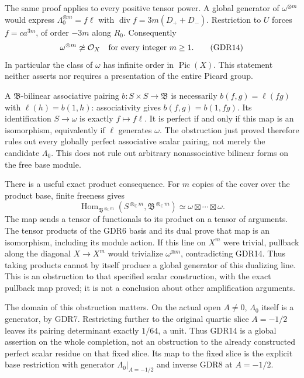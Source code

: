 \documentclass[10pt]{article}
\newcommand{\C}{\mathbb C}
\newcommand{\Div}{\operatorname{div}}
\newcommand{\Hom}{\operatorname{Hom}}
\begin{document}
The same proof applies to every positive tensor power. A global
generator of $\omega^{\otimes m}$ would express
$\Lambda_0^{\otimes m}=f\ell$ with
$\Div f=3m(D_++D_-)$. Restriction to $U$ forces
$f=c a^{3m}$, of order $-3m$ along $R_0$. Consequently
\begin{equation}
 \omega^{\otimes m}\not\simeq\mathcal O_X
 \quad\hbox{for every integer }m\ge1.
 \tag{GDR14}
\end{equation}
In particular the class of $\omega$ has infinite order in
$\operatorname{Pic}(X)$. This statement neither asserts nor
requires a presentation of the entire Picard group.

A $\mathfrak B$-bilinear associative pairing $b:S\times S\to
\mathfrak B$ is necessarily $b(f,g)=\ell(fg)$ with
$\ell(h)=b(1,h)$: associativity gives
$b(f,g)=b(1,fg)$. Its identification $S\to\omega$ is
exactly $f\mapsto f\ell$. It is perfect if and only if this
map is an isomorphism, equivalently if $\ell$ generates
$\omega$. The obstruction just proved therefore rules out
every globally perfect associative scalar pairing, not merely
the candidate $\Lambda_0$. This does not rule out arbitrary
nonassociative bilinear forms on the free base module.

There is a useful exact product consequence. For $m$ copies of
the cover over the product base, finite freeness gives
\[
 \Hom_{\mathfrak B^{\otimes_\C m}}
 (S^{\otimes_\C m},\mathfrak B^{\otimes_\C m})
 \simeq \omega\boxtimes\cdots\boxtimes\omega.
\]
The map sends a tensor of functionals to its product on a tensor
of arguments. The tensor products of the GDR6 basis and its
dual prove that map is an isomorphism, including its module
action. If this line on $X^m$ were trivial, pullback along the
diagonal $X\to X^m$ would trivialize $\omega^{\otimes m}$,
contradicting GDR14. Thus taking products cannot by itself
produce a global generator of this dualizing line. This is
an obstruction to that specified scalar construction, with
the exact pullback map proved; it is not a conclusion about
other amplification arguments.

The domain of this obstruction matters. On the actual open
$A\ne0$, $\Lambda_0$ itself is a generator, by GDR7.
Restricting further to the original quartic slice $A=-1/2$
leaves its pairing determinant exactly $1/64$, a unit.
Thus GDR14 is a global assertion on the whole completion,
not an obstruction to the already constructed perfect
scalar residue on that fixed slice. Its map to the fixed
slice is the explicit base restriction with generator
$\Lambda_0|_{A=-1/2}$ and inverse GDR8 at $A=-1/2$.
\end{document}
